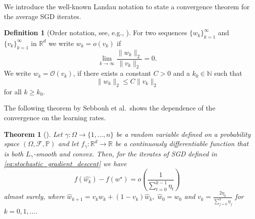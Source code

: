 \documentclass[12pt]{article}
\newtheorem{theorem}{Theorem}[section]
\newtheorem{lemma}[lemma]{Lemma}
\theoremstyle{definition}
\newtheorem{definition}[definition]{Definition}
\numberwithin{equation}{section}
\newcommand{\N}{\mathbb{N}}
\newcommand{\R}{\mathbb{R}}
\newcommand{\BP}{\mathbb{P}}
\newcommand{\CF}{\mathcal{F}}
\newcommand{\CO}{\mathcal{O}}
\newcommand{\ev}[1]{\mathbb{E}\left[{#1}\right]}
\newcommand{\norm}[1]{\lVert{#1}\rVert_2}
\begin{document}
We introduce the well-known Landau notation to state a convergence theorem for the average SGD iterates.
\begin{definition}[Order notation, see, e.g., ]
  For two sequences $\{w_k\}_{k=1}^\infty$ and $\{v_k\}_{k=1}^\infty$ in $\R^d$ we write $w_k = o(v_k)$ if
  \begin{equation*}
    \lim_{k \rightarrow \infty} \frac{\norm{w_k}}{\norm{v_k}} = 0.
  \end{equation*}
  We write $w_k = \CO(v_k)$, if there exists a constant $C > 0$ and a $k_0 \in \N$ such that
  \begin{equation*}
    \norm{w_k} \leq C \norm{v_k}
  \end{equation*}
  for all $k \geq k_0$.
\end{definition}
The following theorem by Sebbouh et al.\ shows the dependence of the convergence on the learning rates.
\begin{theorem}[]
  \label{thm:almost_sure_convergence}
  Let $\gamma : \Omega \rightarrow \{1,\dots,n\}$ be a random variable defined on a probability space $(\Omega, \CF, \BP)$ and let $f_{\gamma} : \R^d \rightarrow \R$ be a continuously differentiable function that is both $L_{\gamma}$-smooth and convex. Then, for the iterates of SGD defined in \eqref{eq:stochastic_gradient_descent} we have 
  \begin{equation*}
    f(\widehat{w_{k}}) - f(w^\star) = o\left(\frac{1}{\sum_{t=0}^{k-1}\eta_t}\right)
  \end{equation*}
  almost surely, where $\widehat{w}_{k+1} = v_k w_k + (1-v_k)\widehat{w}_k, \; \widehat{w}_0 = w_0$ and $v_k = \frac{2\eta_k}{\sum_{j=0}^k\eta_j}$ for $k=0,1,\dots$.
\end{theorem}
\end{document}
